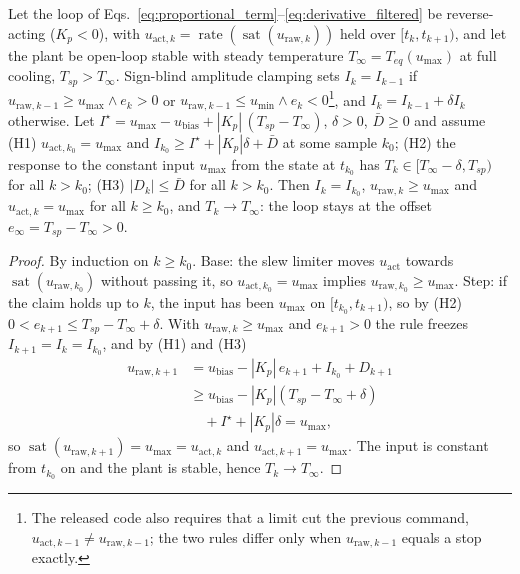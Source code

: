 \begin{proposition}\label{prop:latch}
Let the loop of Eqs.~\eqref{eq:proportional_term}--\eqref{eq:derivative_filtered} be reverse-acting ($K_p < 0$), with $u_{\text{act},k} = \operatorname{rate}(\operatorname{sat}(u_{\text{raw},k}))$ held over $[t_k, t_{k+1})$, and let the plant be open-loop stable with steady temperature $T_\infty = T_{eq}(u_{\max})$ at full cooling, $T_{sp} > T_\infty$. Sign-blind amplitude clamping sets $I_k = I_{k-1}$ if $u_{\text{raw},k-1} \ge u_{\max} \wedge e_k > 0$ or $u_{\text{raw},k-1} \le u_{\min} \wedge e_k < 0$\footnote{The released code also requires that a limit cut the previous command, $u_{\text{act},k-1} \ne u_{\text{raw},k-1}$; the two rules differ only when $u_{\text{raw},k-1}$ equals a stop exactly.}, and $I_k = I_{k-1} + \delta I_k$ otherwise. Let $I^\star = u_{\max} - u_{\text{bias}} + |K_p|\,(T_{sp} - T_\infty)$, $\delta > 0$, $\bar D \ge 0$ and assume
(H1) $u_{\text{act},k_0} = u_{\max}$ and $I_{k_0} \ge I^\star + |K_p|\delta + \bar D$ at some sample $k_0$;
(H2) the response to the constant input $u_{\max}$ from the state at $t_{k_0}$ has $T_k \in [T_\infty - \delta, T_{sp})$ for all $k > k_0$;
(H3) $|D_k| \le \bar D$ for all $k > k_0$.
Then $I_k = I_{k_0}$, $u_{\text{raw},k} \ge u_{\max}$ and $u_{\text{act},k} = u_{\max}$ for all $k \ge k_0$, and $T_k \to T_\infty$: the loop stays at the offset $e_\infty = T_{sp} - T_\infty > 0$.
\end{proposition}
\begin{proof}
By induction on $k \ge k_0$. Base: the slew limiter moves $u_{\text{act}}$ towards $\operatorname{sat}(u_{\text{raw},k_0})$ without passing it, so $u_{\text{act},k_0} = u_{\max}$ implies $u_{\text{raw},k_0} \ge u_{\max}$. Step: if the claim holds up to $k$, the input has been $u_{\max}$ on $[t_{k_0}, t_{k+1})$, so by (H2) $0 < e_{k+1} \le T_{sp} - T_\infty + \delta$. With $u_{\text{raw},k} \ge u_{\max}$ and $e_{k+1} > 0$ the rule freezes $I_{k+1} = I_k = I_{k_0}$, and by (H1) and (H3)
\begin{align*}
u_{\text{raw},k+1} &= u_{\text{bias}} - |K_p|\,e_{k+1} + I_{k_0} + D_{k+1} \\
&\ge u_{\text{bias}} - |K_p|(T_{sp} - T_\infty + \delta) \\
&\quad + I^\star + |K_p|\delta = u_{\max},
\end{align*}
so $\operatorname{sat}(u_{\text{raw},k+1}) = u_{\max} = u_{\text{act},k}$ and $u_{\text{act},k+1} = u_{\max}$. The input is constant from $t_{k_0}$ on and the plant is stable, hence $T_k \to T_\infty$.
\renewcommand{\qedsymbol}{}
\end{proof}

